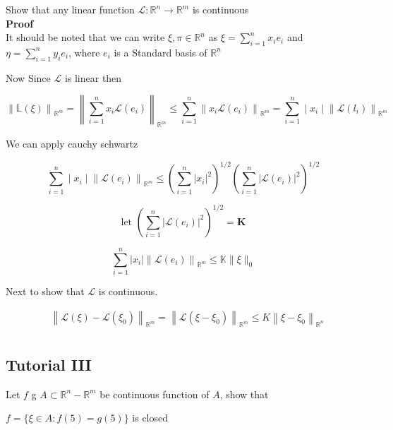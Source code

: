 \documentclass{article}
\begin{document}
Show that any linear function $\mathcal{L}: \mathbb{R}^{n} \rightarrow \mathbb{R}^{m}$ is continuous\\


\textbf{Proof}\\

It should be noted that we can write $\xi, \pi \in \mathbb{R}^{n}$ as $\xi=\sum_{i=1}^{n} x_{i} e_{i}$ and $\eta=\sum_{i=1}^{n} y_{i} e_{i}$, where $e_{i}$ is a Standard basis of $\mathbb{R}^{n}$

 Now Since $\mathcal{L}$ is linear then

$$
\left\|\mathbb{L}(\xi)\right\|_{\mathbb{R}^{m}}=\left\|\sum_{i=1}^{n} x_{i} \mathcal{L}\left(e_{i}\right)\right\|_{\mathbb{R}^{m}} \leq \sum_{i=1}^{n}\left\|x_{i} \mathcal{L}\left(e_{i}\right)\right\|_{\mathbb{R}^{m}}=\sum_{i=1}^{n} \mid x_{i}\mid\left\|\mathcal{L}\left(l_{i}\right)\right\|_{\mathbb{R}^{m}}
$$

We can apply cauchy schwartz

$$
\sum_{i=1}^{n}\mid x_{i}\mid \left \| \mathcal{L}\left(e_{i}\right)\right\|_{\mathbb{R}^{m}} \leq\left(\sum_{i=1}^{n}\left|x_{i}\right|^{2}\right)^{1 / 2}\left(\sum_{i=1}^{n}\left|\mathcal{L}\left(e_{i}\right)\right|^{2}\right)^{1 / 2}$$

$$
\text{let } \left(\sum_{i=1}^{n}\left|\mathcal{L}\left(e_{i}\right)\right|^{2}\right)^{1 / 2}=\mathbf{K}$$

$$\sum_{i=1}^{n}\left|x_{i}\right|\left\| \mathcal{L}\left(e_{i}\right)\right\|_{\mathbb{R}^{m}} \leq \mathbb{K} \| \xi \|_{0}
$$

Next to show that $\mathcal{L}$ is continuous.

$$
\begin{aligned}
& \left\|\mathcal{L}(\xi)-\mathcal{L}\left(\xi_{0}\right)\right\|_{\mathbb{R}^{m}}=\left\|\mathcal{L}\left(\xi-\xi_{0}\right)\right\|_{\mathbb{R}^{m}} \leq K\left\|\xi-\xi_{0}\right\|_{\mathbb{R}^{n}} \\
\end{aligned}
$$


\subsection{Tutorial III}

Let $f$ g $A \subset \mathbb{R}^{n}-\mathbb{R}^{m}$ be continuous function of $A$, show that

$f=\{\xi \in A: f(5)=g(5)\}$ is closed\\
\end{document}
